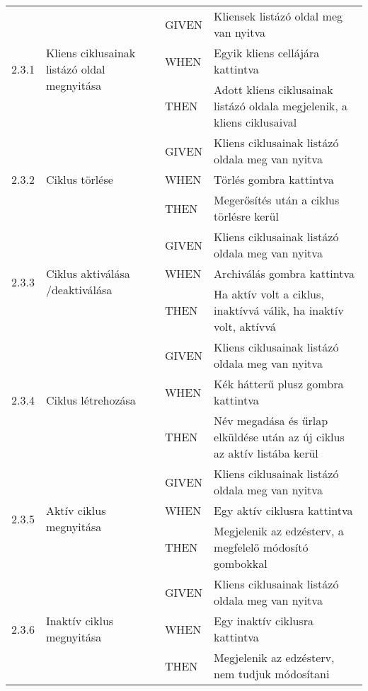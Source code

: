 \begin{center}
\begin{longtable}{ | p{} | p{} | p{} | p{} | }
			\multirow{3}{*}{2.3.1} 
			& \multirow{3}{=}{Kliens ciklusainak listázó oldal megnyitása} 
			& GIVEN 
			& Kliensek listázó oldal meg van nyitva \\
			\cline{3-4}
			& & WHEN 
			& Egyik kliens cellájára kattintva \\
			\cline{3-4}
			& & THEN 
			& Adott kliens ciklusainak listázó oldala megjelenik, a kliens ciklusaival \\
			\hline

			\multirow{3}{*}{2.3.2} 
			& \multirow{3}{=}{Ciklus törlése}
			& GIVEN 
			& Kliens ciklusainak listázó oldala meg van nyitva \\
			\cline{3-4}
			& & WHEN 
			& Törlés gombra kattintva \\
			\cline{3-4}
			& & THEN 
			& Megerősítés után a ciklus törlésre kerül \\
			\hline

			\multirow{3}{*}{2.3.3} 
			& \multirow{3}{=}{Ciklus aktiválása /deaktiválása} 
			& GIVEN 
			& Kliens ciklusainak listázó oldala meg van nyitva \\
			\cline{3-4}
			& & WHEN 
			& Archiválás gombra kattintva \\
			\cline{3-4}
			& & THEN 
			& Ha aktív volt a ciklus, inaktívvá válik, ha inaktív volt, aktívvá \\
			\hline

			\multirow{3}{*}{2.3.4} 
			& \multirow{3}{=}{Ciklus létrehozása} 
			& GIVEN 
			& Kliens ciklusainak listázó oldala meg van nyitva \\
			\cline{3-4}
			& & WHEN 
			& Kék hátterű plusz gombra kattintva \\
			\cline{3-4}
			& & THEN 
			& Név megadása és űrlap elküldése után az új ciklus az aktív listába kerül \\
			\hline

			\multirow{3}{*}{2.3.5} 
			& \multirow{3}{=}{Aktív ciklus megnyitása} 
			& GIVEN 
			& Kliens ciklusainak listázó oldala meg van nyitva \\
			\cline{3-4}
			& & WHEN 
			& Egy aktív ciklusra kattintva \\
			\cline{3-4}
			& & THEN 
			& Megjelenik az edzésterv, a megfelelő módosító gombokkal \\
			\hline

			\multirow{3}{*}{2.3.6} 
			& \multirow{3}{=}{Inaktív ciklus megnyitása} 
			& GIVEN 
			& Kliens ciklusainak listázó oldala meg van nyitva \\
			\cline{3-4}
			& & WHEN 
			& Egy inaktív ciklusra kattintva \\
			\cline{3-4}
			& & THEN 
			& Megjelenik az edzésterv, nem tudjuk módosítani \\
			\hline


\end{longtable}
\end{center}
